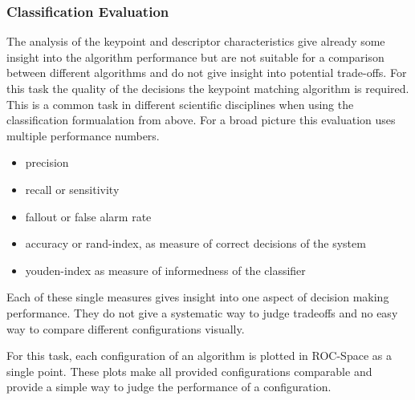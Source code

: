\subsubsection{Classification Evaluation}

The analysis of the keypoint and descriptor characteristics give already some insight into the algorithm performance but are not suitable for a comparison between different algorithms and do not give insight into potential trade-offs.
For this task the quality of the decisions the keypoint matching algorithm is required.
This is a common task in different scientific disciplines when using the classification formualation from above.
For a broad picture this evaluation uses multiple performance numbers.

\begin{itemize}
    \item precision
    \item recall or sensitivity
    \item fallout or false alarm rate
    \item accuracy or rand-index, as measure of correct decisions of the system
    \item youden-index as measure of informedness of the classifier
\end{itemize}

Each of these single measures gives insight into one aspect of decision making performance.
They do not give a systematic way to judge tradeoffs and no easy way to compare different configurations visually.

For this task, each configuration of an algorithm is plotted in \gls{ROC}-Space as a single point.
These plots make all provided configurations comparable and provide a simple way to judge the performance of a configuration.
